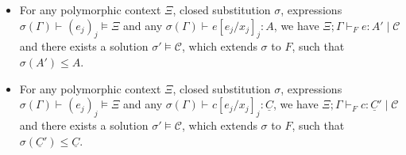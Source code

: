 \documentclass{LMCS}
\newcommand{\C}{\underline{C}}
\newcommand{\ctx}{\Gamma}
\newcommand{\pctx}{\Xi}
\newcommand{\ent}[1][]{\vdash_{#1}}
\newcommand{\T}{\mathrel{:}}
\newcommand{\while}{\mid}
\renewcommand{\le}{\leqslant}
\newcommand{\cstr}{\mathcal{C}}
\newcommand{\sol}{\sigma}
\begin{document}
\begin{prop}[Completeness]
\label{prop:completeness}
\hfill
\begin{itemize}
\item
  For any polymorphic context $\pctx$, closed substitution $\sol$, expressions $\sol(\ctx) \ent (e_j)_j \models \pctx$ and
  any $\sol(\ctx) \ent e[e_j / x_j]_j \T A$,
  we have $\pctx; \ctx \ent[F] e \T A' \while \cstr$ and
  there exists a solution $\sol' \models \cstr$, which extends $\sol$ to $F$,
  such that $\sol(A') \le A$.
\item
  For any polymorphic context $\pctx$, closed substitution $\sol$, expressions $\sol(\ctx) \ent (e_j)_j \models \pctx$ and
  any $\sol(\ctx) \ent c[e_j / x_j]_j \T \C$,
  we have $\pctx; \ctx \ent[F] c \T \C' \while \cstr$ and
  there exists a solution $\sol' \models \cstr$, which extends $\sol$ to $F$,
  such that $\sol(\C') \le \C$.
\end{itemize}
\end{prop}
\end{document}
